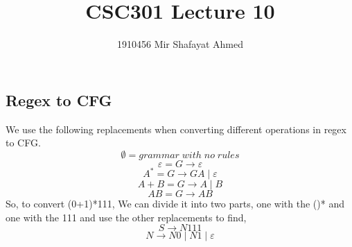 \documentclass{article}
\title{CSC301 Lecture 10}
\author{1910456 Mir Shafayat Ahmed}
\begin{document}
    \pagecolor[HTML]{FFFFCC}
    \maketitle
    \subsection*{Regex to CFG}
    We use the following replacements when converting different operations in regex to CFG.
    $$\emptyset = grammar\;with\;no\;rules$$
    $$\varepsilon = G\to\varepsilon$$
    $$A^*= G\to GA\;|\;\varepsilon$$
    $$A+B = G\to A\;|\;B$$
    $$AB = G\to AB$$
    So, to convert (0+1)*111,
    We can divide it into two parts, one with the ()* and one with the 111 and use the other replacements to find,
    $$S\to N111$$
    $$N\to N0\;|\;N1\;|\;\varepsilon$$
\end{document}
